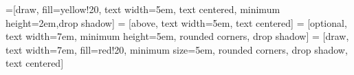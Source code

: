 
\theoremstyle{plain}
\newtheorem{definition}[subsection]{Definition}    %

\newtheorem{example}{Ejemplo}										 %

\newtheorem{theorem}{Teorema}											 %

\newtheorem*{proofa}{Prueba}

\hypersetup{urlcolor=blue}			 %

\newcommand{\fn}[1]{\texttt{#1}}						%
\newcommand{\cn}[1]{\texttt{\char92 #1}}
\newcommand{\gnuradio}{\emph{GNURadio}}



\lstset{language=Python,basicstyle=\footnotesize\sffamily,captionpos=b, showstringspaces=false}
\renewcommand{\lstlistingname}{Listado}
\renewcommand{\lstlistlistingname}{\'Indice de listados}

=[draw, fill=yellow!20, text width=5em, 
    text centered, minimum height=2em,drop shadow]
 = [above, text width=5em, text centered]
 = [optional, text width=7em, 
    minimum height=5em, rounded corners, drop shadow]
 = [draw, text width=7em, fill=red!20, 
    minimum size=5em, rounded corners, drop shadow, text centered]
    
\def\antenna{-- +(0mm,4.0mm) -- +(2.625mm,7.5mm) -- +(-2.625mm,7.5mm) -- +(0mm,4.0mm)}
    
\def\blockdist{2.3}
\def\edgedist{2.5}
